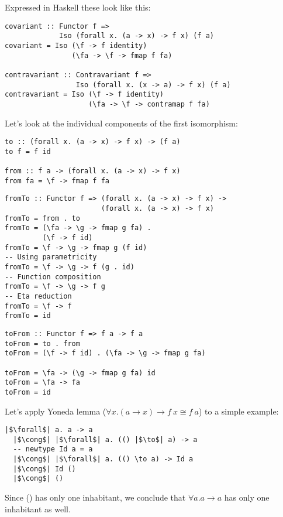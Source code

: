 \documentclass[tikz]{beamer}
\theoremstyle{definition}
\begin{document}
\begin{frame}[fragile]
Expressed in Haskell these look like this:
\begin{verbatim}
covariant :: Functor f =>
             Iso (forall x. (a -> x) -> f x) (f a)
covariant = Iso (\f -> f identity)
                (\fa -> \f -> fmap f fa)

contravariant :: Contravariant f =>
                 Iso (forall x. (x -> a) -> f x) (f a)
contravariant = Iso (\f -> f identity)
                    (\fa -> \f -> contramap f fa)
\end{verbatim}
\end{frame}

\begin{frame}[fragile]
Let's look at the individual components of the first isomorphism:
\begin{verbatim}
to :: (forall x. (a -> x) -> f x) -> (f a)
to f = f id

from :: f a -> (forall x. (a -> x) -> f x)
from fa = \f -> fmap f fa
\end{verbatim}
\end{frame}


\begin{frame}[fragile]
\begin{verbatim}
fromTo :: Functor f => (forall x. (a -> x) -> f x) ->
                       (forall x. (a -> x) -> f x)
fromTo = from . to
fromTo = (\fa -> \g -> fmap g fa) .
         (\f -> f id)
fromTo = \f -> \g -> fmap g (f id)
-- Using parametricity
fromTo = \f -> \g -> f (g . id)
-- Function composition
fromTo = \f -> \g -> f g
-- Eta reduction
fromTo = \f -> f
fromTo = id
\end{verbatim}
\end{frame}

\begin{frame}[fragile]
\begin{verbatim}
toFrom :: Functor f => f a -> f a
toFrom = to . from
toFrom = (\f -> f id) . (\fa -> \g -> fmap g fa)

toFrom = \fa -> (\g -> fmap g fa) id
toFrom = \fa -> fa
toFrom = id
\end{verbatim}
\end{frame}

\begin{frame}[fragile]
Let's apply Yoneda lemma ($\forall x. (a \to x) \to f~x \cong f~a$) to a simple example:

\begin{verbatim}
|$\forall$| a. a -> a
  |$\cong$| |$\forall$| a. (() |$\to$| a) -> a
  -- newtype Id a = a
  |$\cong$| |$\forall$| a. (() \to a) -> Id a
  |$\cong$| Id ()
  |$\cong$| ()
\end{verbatim}

Since () has only one inhabitant, we conclude that $\forall a. a \to a$ has only one inhabitant as well.
\end{frame}
\end{document}
